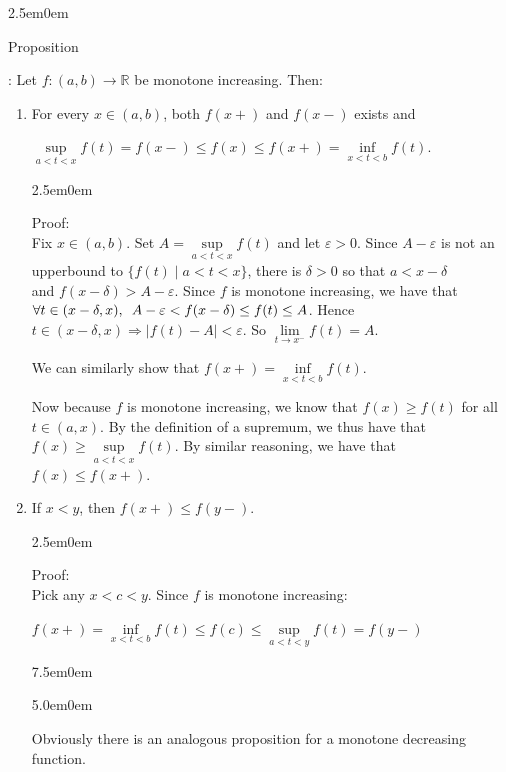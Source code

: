 \documentclass{book}
\newcommand{\hTwo}{%
   \color{MidnightBlue}%
   \fontsize{13}{15}\selectfont%
}
\newcommand{\hThree}{%
   \color{PineGreen}
   \fontsize{13}{15}\selectfont%
}
\newcommand{\hFour}{%
   \color{Cerulean}
   \fontsize{12}{14}\selectfont%
}
\newenvironment{myIndent}{%
   \begin{adjustwidth}{2.5em}{0em}%
}{%
   \end{adjustwidth}%
}
\newenvironment{myDindent}{%
   \begin{adjustwidth}{5.0em}{0em}%
}{%
   \end{adjustwidth}%
}
\newenvironment{myTindent}{%
   \begin{adjustwidth}{7.5em}{0em}%
}{%
   \end{adjustwidth}%
}
\newcommand{\retTwo}{\hfill\bigbreak}
\newcommand{\myHS}{ \hspace{0.5em}}
\newcounter{PropNumber}
\newcommand{\propCount}[1][1]{%
   \addtocounter{PropNumber}{#1}%
   \thePropNumber%
}
\begin{document}
   
   {\begin{myIndent} \hTwo
      Proposition \propCount: Let $f: (a, b) \rightarrow \mathbb{R}$ be monotone increasing. Then:
      \begin{enumerate}
         \item For every $x \in (a, b)$, both $f(x+)$ and $f(x-)$ exists and
         
         {\centering$\sup\limits_{a < t < x} f(t) = f(x-) \leq f(x) \leq f(x+) = \inf\limits_{x < t < b} f(t)$.\par}

         \newpage

         {\begin{myIndent} \hThree
            Proof:\\
            Fix $x \in (a, b)$. Set $A = \sup\limits_{a < t < x} f(t)$ and let $\varepsilon > 0$. Since $A - \varepsilon$ is not an upperbound to $\{f(t) \mid a < t < x\}$, there is $\delta > 0$ so that $a < x - \delta$ \\ and $f(x - \delta) > A - \varepsilon$. Since $f$ is monotone increasing, we have that \\ $\forall t \in (x-\delta, x), \myHS A -\varepsilon < f(x - \delta) \leq f(t) \leq A$. Hence \\ $t \in (x - \delta, x) \Longrightarrow |f(t) - A| < \varepsilon$. So $\lim\limits_{t\rightarrow x^-}f(t) = A$. \retTwo

            We can similarly show that $f(x+) = \inf\limits_{x < t < b} f(t)$. \retTwo

            Now because $f$ is monotone increasing, we know that $f(x) \geq f(t)$ for all $t \in (a, x)$. By the definition of a supremum, we thus have that\\ $f(x) \geq \sup\limits_{a < t < x} f(t)$. By similar reasoning, we have that $f(x) \leq f(x+)$. \retTwo
         \end{myIndent}}

         \item If $x < y$, then $f(x+) \leq f(y-)$.
         {\begin{myIndent} \hThree
            Proof:\\
            Pick any $x < c < y$. Since $f$ is monotone increasing:

            {\centering $f(x+) = \inf\limits_{x < t < b} f(t) \leq f(c) \leq \sup\limits_{a < t < y} f(t) = f(y-)$ \retTwo\par}
            
            {\begin{myTindent}\begin{myDindent} \hFour
               Obviously there is an analogous proposition for a monotone decreasing function. \retTwo
            \end{myDindent}\end{myTindent}}
         \end{myIndent}}
      \end{enumerate}


\end{myIndent}}
\end{document}

